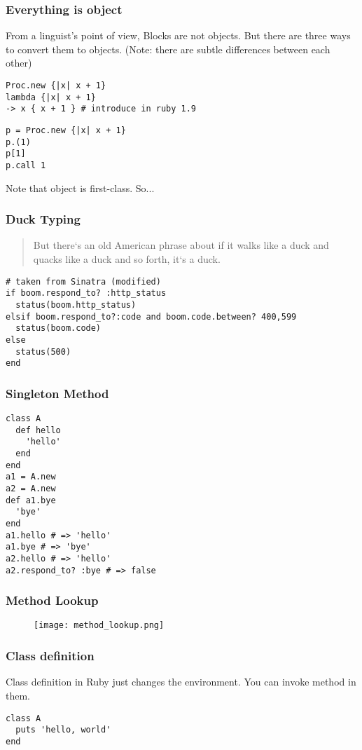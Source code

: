 \documentclass[11pt]{beamer}
\begin{document}
\begin{frame}[fragile]
\frametitle{Everything is object}
From a linguist's point of view, Blocks are not objects.
But there are three ways to convert them to objects.
(Note: there are subtle differences between each other)
\begin{verbatim}
Proc.new {|x| x + 1}
lambda {|x| x + 1}
-> x { x + 1 } # introduce in ruby 1.9
\end{verbatim}
\begin{verbatim}
p = Proc.new {|x| x + 1}
p.(1)
p[1]
p.call 1
\end{verbatim}
Note that object is first-class. So...
\end{frame}

\begin{frame}[fragile]
\frametitle{Duck Typing}
\begin{quotation}
But there`s an old American phrase about if it walks like a duck and quacks like a duck and so 
forth, it`s a duck.
\end{quotation}
\begin{verbatim}
# taken from Sinatra (modified)
if boom.respond_to? :http_status
  status(boom.http_status)
elsif boom.respond_to?:code and boom.code.between? 400,599
  status(boom.code)
else
  status(500)
end
\end{verbatim}
\end{frame}

\begin{frame}[fragile]
\frametitle{Singleton Method}
\begin{verbatim}
class A
  def hello
    'hello'
  end
end
a1 = A.new
a2 = A.new
def a1.bye
  'bye'
end
a1.hello # => 'hello'
a1.bye # => 'bye'
a2.hello # => 'hello'
a2.respond_to? :bye # => false
\end{verbatim}
\end{frame}

\begin{frame}[fragile]
\frametitle{Method Lookup}
\begin{figure}[htbp]
    \texttt{[image: method\_lookup.png]}
\end{figure}
\end{frame}

\begin{frame}[fragile]
\frametitle{Class definition}
Class definition in Ruby just changes the environment.
You can invoke method in them.
\begin{verbatim}
class A
  puts 'hello, world'
end
\end{verbatim}
\end{frame}
\end{document}
